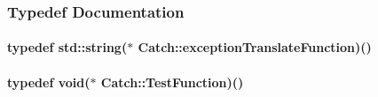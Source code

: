 \subsubsection{Typedef Documentation}
\hypertarget{namespaceCatch_ae1727c8cadfc5ad8b43dff651cd2f8b0}{
\paragraph[{exception\-Translate\-Function}]{\setlength{\rightskip}{0pt plus 5cm}typedef std\-::string($\ast$ Catch\-::exception\-Translate\-Function)()}}\label{namespaceCatch_ae1727c8cadfc5ad8b43dff651cd2f8b0}
\hypertarget{namespaceCatch_a768da872b9033e4c71c6f316393d35db}{
\paragraph[{Test\-Function}]{\setlength{\rightskip}{0pt plus 5cm}typedef void($\ast$ Catch\-::\-Test\-Function)()}}\label{namespaceCatch_a768da872b9033e4c71c6f316393d35db}


